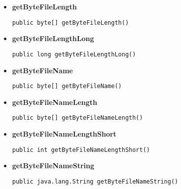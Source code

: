 {{{{{\begin{itemize}
{\begin{itemize}
{Returns the Location where the Client/Server runs (without /bin).
}
\item{{\bf  Returns} -- 
location. 
}%
\end{itemize}
}%
\item{ 
\hypertarget{filetransferUDP.FileTransfer.getByteFileLength()}{{\bf  getByteFileLength}\\}
\begin{lstlisting}[frame=none]
public byte[] getByteFileLength()\end{lstlisting} %
}%
\item{ 
\hypertarget{filetransferUDP.FileTransfer.getByteFileLengthLong()}{{\bf  getByteFileLengthLong}\\}
\begin{lstlisting}[frame=none]
public long getByteFileLengthLong()\end{lstlisting} %
}%
\item{ 
\hypertarget{filetransferUDP.FileTransfer.getByteFileName()}{{\bf  getByteFileName}\\}
\begin{lstlisting}[frame=none]
public byte[] getByteFileName()\end{lstlisting} %
}%
\item{ 
\hypertarget{filetransferUDP.FileTransfer.getByteFileNameLength()}{{\bf  getByteFileNameLength}\\}
\begin{lstlisting}[frame=none]
public byte[] getByteFileNameLength()\end{lstlisting} %
}%
\item{ 
\hypertarget{filetransferUDP.FileTransfer.getByteFileNameLengthShort()}{{\bf  getByteFileNameLengthShort}\\}
\begin{lstlisting}[frame=none]
public int getByteFileNameLengthShort()\end{lstlisting} %
}%
\item{ 
\hypertarget{filetransferUDP.FileTransfer.getByteFileNameString()}{{\bf  getByteFileNameString}\\}
\begin{lstlisting}[frame=none]
public java.lang.String getByteFileNameString()\end{lstlisting} %
}
\end{itemize}}}}}}
